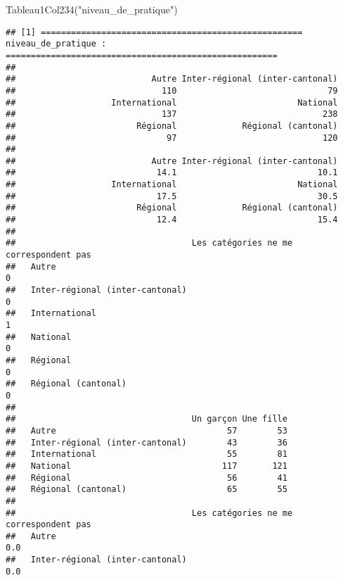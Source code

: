 \documentclass[
]{article}
\newenvironment{Shaded}{\begin{snugshade}}{\end{snugshade}}
\newcommand{\FunctionTok}[1]{\textcolor[rgb]{0.00,0.00,0.00}{#1}}
\newcommand{\NormalTok}[1]{#1}
\newcommand{\StringTok}[1]{\textcolor[rgb]{0.31,0.60,0.02}{#1}}
\begin{document}
\begin{Shaded}
\begin{Highlighting}[]
\FunctionTok{Tableau1Col234}\NormalTok{(}\StringTok{"niveau\_de\_pratique"}\NormalTok{)}
\end{Highlighting}
\end{Shaded}

\begin{verbatim}
## [1] ==================================================== niveau_de_pratique : ======================================================
## 
##                           Autre Inter-régional (inter-cantonal) 
##                             110                              79 
##                   International                        National 
##                             137                             238 
##                        Régional             Régional (cantonal) 
##                              97                             120 
## 
##                           Autre Inter-régional (inter-cantonal) 
##                            14.1                            10.1 
##                   International                        National 
##                            17.5                            30.5 
##                        Régional             Régional (cantonal) 
##                            12.4                            15.4 
##                                  
##                                   Les catégories ne me correspondent pas
##   Autre                                                                0
##   Inter-régional (inter-cantonal)                                      0
##   International                                                        1
##   National                                                             0
##   Régional                                                             0
##   Régional (cantonal)                                                  0
##                                  
##                                   Un garçon Une fille
##   Autre                                  57        53
##   Inter-régional (inter-cantonal)        43        36
##   International                          55        81
##   National                              117       121
##   Régional                               56        41
##   Régional (cantonal)                    65        55
##                                  
##                                   Les catégories ne me correspondent pas
##   Autre                                                              0.0
##   Inter-régional (inter-cantonal)                                    0.0

\end{verbatim}
\end{document}
